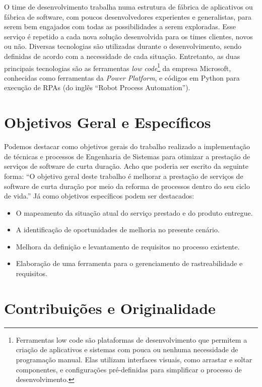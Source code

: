	O time de desenvolvimento trabalha numa estrutura de fábrica de aplicativos ou fábrica de software, 
	com poucos desenvolvedores experientes e generalistas, para serem bem 
	engajados com todas as possibilidades a serem exploradas. Esse serviço é repetido 
	a cada nova solução desenvolvida para os times clientes, novos ou não. 
	Diversas tecnologias são utilizadas durante o desenvolvimento, sendo definidas de 
	acordo com a necessidade de cada situação. Entretanto, as duas principais 
	tecnologias são as ferramentas \textit{low code}\footnote{Ferramentas low code são plataformas de desenvolvimento que permitem a criação de aplicativos e sistemas com pouca ou nenhuma necessidade de programação manual. Elas utilizam interfaces visuais, como arrastar e soltar componentes, e configurações pré-definidas para simplificar o processo de desenvolvimento.} da empresa Microsoft, conhecidas como 
	ferramentas da \textit{Power Platform}, e códigos em Python para execução de RPAs (do 
	inglês ``Robot Process Automation''). 

	\section{Objetivos Geral e Específicos}\label{sec:introducao:objetivos}

		Podemos destacar como objetivos gerais do trabalho realizado a implementação de 
		técnicas e processos de Engenharia de Sistemas para otimizar a prestação de 
		serviços de software de curta duração. {\color{red} Acho que poderia ser escrito da seguinte forma: ``O objetivo geral deste trabalho é melhorar a prestação de serviços de software de curta duração por meio da reforma de processos dentro do seu ciclo de vida.''}
		Já como objetivos específicos podem ser destacados: 
		\begin{itemize}
			\item O mapeamento da situação atual do serviço prestado e do produto entregue.
			\item A identificação de oportunidades de melhoria no presente cenário. 
			\item Melhora da definição e levantamento de requisitos no processo existente.
			\item Elaboração de uma ferramenta para o gerenciamento de rastreabilidade e requisitos.
		\end{itemize}
 		
	\section{Contribuições e Originalidade}\label{sec:introducao:contribuicoes}

